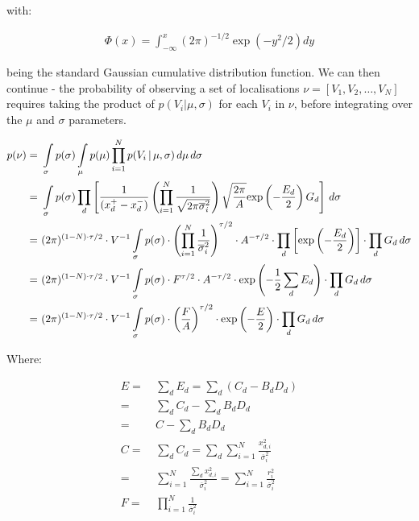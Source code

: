 \documentclass[11pt]{article}
\newcommand{\sig}{\overline{\sigma}_i}
\newcommand{\eq}{=&\ }
\newcommand{\ints}{\int\displaylimits_\sigma}
\newcommand{\intm}{\int\displaylimits_\mu}
\begin{document}
with:

\begin{align*}
	\Phi(x) = \int_{-\infty}^{x} (2\pi)^{-1/2} \exp(-y^2 / 2) dy
\end{align*}

being the standard Gaussian cumulative distribution function. We can then continue - the probability of observing a set of localisations $\nu = [V_1, V_2, \dots, V_N]$ requires taking the product of $p(V_i | \mu, \sigma)$ for each $V_i$ in $\nu$, before integrating over the $\mu$ and $\sigma$ parameters. 

\begin{align} \label{numericallyUnstableIntegral}
	p( \nu ) \eq \ints p(\sigma) \intm p(\mu) \prod_{i=1}^{N} p(V_{i}\,|\,\mu,\sigma)\,d\mu\,d\sigma \nonumber \\
	\eq \ints p(\sigma) \prod_d \left[ \frac{1}{(x_d^+ - x_d^-)} \left(\prod_{i=1}^{N} \frac{1}{\sqrt{2\pi\sig^2}}\right)\sqrt{\frac{2\pi}{A}}\text{exp}\left(-\frac{E_d}{2}\right)G_d \right]\,d\sigma \nonumber \\  
	\eq (2\pi)^{(1-N)\cdot\tau/2} \cdot V^{-1} \ints p(\sigma) \cdot \left(\prod_{i=1}^{N} \frac{1}{\sig^2}\right)^{\tau/2} \cdot A^{-\tau/2} \cdot \prod_d\left[\text{exp}\left(-\frac{E_d}{2}\right)\right] \cdot \prod_d G_d \,d\sigma \nonumber \\
	\eq (2\pi)^{(1-N)\cdot\tau/2} \cdot V^{-1} \ints p(\sigma) \cdot F^{\tau/2} \cdot A^{-\tau/2} \cdot \text{exp}\left(-\frac{1}{2}\sum_d E_d\right) \cdot \prod_d G_d \,d\sigma \nonumber \\
	\eq (2\pi)^{(1-N)\cdot\tau/2} \cdot V^{-1} \ints p(\sigma)\cdot\left(\frac{F}{A}\right)^{\tau/2}\cdot\text{exp}\left(-\frac{E}{2}\right) \cdot \prod_d G_d \,d\sigma 
\end{align}

Where:

\begin{align}
	E \eq \sum_d E_d 
	= \sum_d (C_d - B_d D_d) \nonumber \\
	\eq \sum_d C_d - \sum_d B_d D_d \nonumber \\
	\eq C - \sum_d B_d D_d \nonumber \\
	C \eq \sum_d C_d 
	= \sum_d \sum_{i=1}^{N} \frac{x_{d,i}^2}{\sig^2} 	\nonumber \\
	\eq \sum_{i=1}^{N} \frac{\sum_d x_{d,i}^2}{\sig^2}	
	= \sum_{i=1}^{N}\frac{r_i^2}{\sig^2}  \\
	F \eq \prod_{i=1}^{N} \frac{1}{\sig^2}  
\end{align} 
\end{document}
